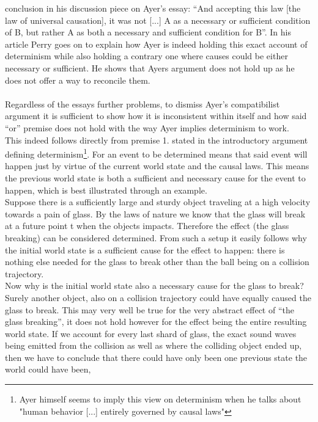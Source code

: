 \documentclass[14pt]{article}
\begin{document}
conclusion in his discussion piece on Ayer's essay:
“And accepting this law [the law of universal causation], it was not [...]
A as a necessary or sufficient condition of B, but rather A as both a
necessary and sufficient condition for B”\autocite[229]{Perry}.
In his article Perry goes on to explain how Ayer is indeed holding
this exact account of determinism while also holding a contrary one where
causes could be either necessary or sufficient. He shows that Ayers argument
does not hold up as he does not offer a way to reconcile them. \\
\\
Regardless of the essays further problems, to dismiss Ayer's compatibilist
argument it is sufficient
to show how it is inconsistent within itself and how said “or” premise
does not hold with the way Ayer implies determinism to work.
\\
This indeed follows directly from premise 1. stated in the introductory argument defining
determinism\footnote{Ayer himself seems to imply this view on determinism when he talks about
"human behavior [...] entirely governed by causal laws"\autocite[139]{Ayer}}.
For an event to be determined means that said event will happen just by
virtue of the current world state and the causal laws. This
means the previous world state is both a sufficient and necessary
cause for the event to happen, which is best illustrated through an example.\\
Suppose there is a sufficiently large and sturdy object traveling at a high
velocity towards a pain of glass. By the laws of nature we know that
the glass will break at a future point t when the objects impacts.
Therefore the effect (the glass breaking) can be considered
determined. From such a setup it easily follows why the initial world state is a
sufficient cause for the effect to happen: there is nothing else needed for
the glass to break other than the ball being on a collision trajectory.\\
Now why is the initial world state also a necessary cause for the glass to break?
Surely another object, also on a collision trajectory could have equally caused the glass to break.
This may very well be true for the very abstract effect of “the glass breaking”,
it does not hold however for the effect being the entire resulting world state.
If we account for every last shard of glass, the exact sound waves being emitted from
the collision as well as where the colliding object ended up,
then we have to conclude that there could have only been one previous state the world could have been,
\end{document}
